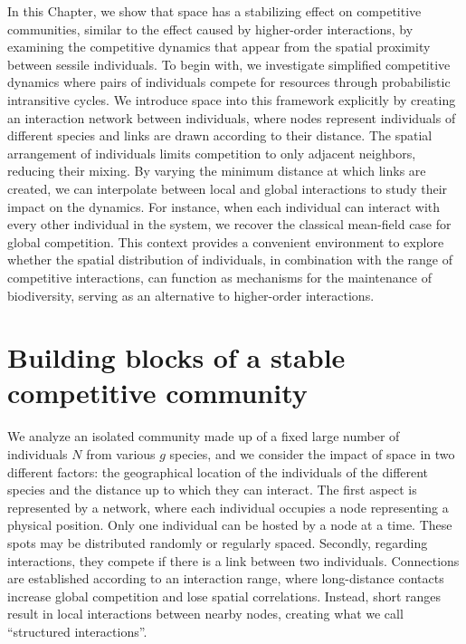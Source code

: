 In this Chapter, we show that space has a stabilizing effect on competitive communities, similar to the effect caused by higher-order interactions, by examining the competitive dynamics that appear from the spatial proximity between sessile individuals. To begin with, we investigate simplified competitive dynamics where pairs of individuals compete for resources through probabilistic intransitive cycles. We introduce space into this framework explicitly by creating an interaction network between individuals, where nodes represent  individuals of different species and links are drawn according to their distance. The spatial arrangement of individuals limits competition to only adjacent neighbors, reducing their mixing. By varying the minimum distance at which links are created, we can interpolate between local and global interactions to study their impact on the dynamics. For instance, when each individual can interact with every other individual in the system, we recover the classical mean-field case for global competition. This context provides a convenient environment to explore whether the spatial distribution of individuals, in combination with the range of competitive interactions, can function as mechanisms for the maintenance of biodiversity, serving as an alternative to higher-order interactions.\\

\section{\label{chp1:1}Building blocks of a stable competitive community}

We analyze an isolated community made up of a fixed large number of individuals $N$ from various $g$ species, and we consider the impact of space in two different factors: the geographical location of the individuals of the different species and the distance up to which they can interact. The first aspect is represented by a network, where each individual occupies a node representing a physical position. Only one individual can be hosted by a node at a time. These spots may be distributed randomly or regularly spaced. Secondly, regarding interactions,  they compete if there is a link between two individuals. Connections are established according to an interaction range, where long-distance contacts increase global competition and lose spatial correlations. Instead, short ranges result in local interactions between nearby nodes, creating what we call ``structured interactions''. \\

